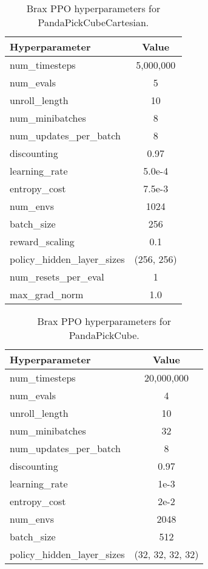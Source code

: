 \begin{table}[ht]
\centering
\begin{tabular}{|l|c|} 
\hline
\textbf{Hyperparameter} & \textbf{Value} \\ \hline
num\_timesteps & 5,000,000 \\ \hline
num\_evals & 5 \\ \hline
unroll\_length & 10 \\ \hline
num\_minibatches & 8 \\ \hline
num\_updates\_per\_batch & 8 \\ \hline
discounting & 0.97 \\ \hline
learning\_rate & 5.0e-4 \\ \hline
entropy\_cost & 7.5e-3 \\ \hline
num\_envs & 1024 \\ \hline
batch\_size & 256 \\ \hline
reward\_scaling & 0.1 \\ \hline
policy\_hidden\_layer\_sizes & (256, 256) \\ \hline 
num\_resets\_per\_eval & 1 \\ \hline
max\_grad\_norm & 1.0 \\ \hline
\end{tabular}
\caption{Brax PPO hyperparameters for PandaPickCubeCartesian.}
\end{table}

\begin{table}[ht]
\centering
\begin{tabular}{|l|c|} 
\hline
\textbf{Hyperparameter} & \textbf{Value} \\ \hline
num\_timesteps & 20,000,000 \\ \hline
num\_evals & 4 \\ \hline
unroll\_length & 10 \\ \hline
num\_minibatches & 32 \\ \hline
num\_updates\_per\_batch & 8 \\ \hline
discounting & 0.97 \\ \hline
learning\_rate & 1e-3 \\ \hline
entropy\_cost & 2e-2 \\ \hline
num\_envs & 2048 \\ \hline
batch\_size & 512 \\ \hline
policy\_hidden\_layer\_sizes & (32, 32, 32, 32) \\ \hline 
\end{tabular}
\caption{Brax PPO hyperparameters for PandaPickCube.}
\end{table}

